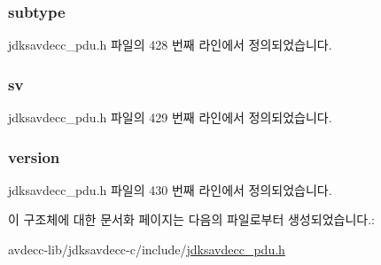 \subsubsection[{\texorpdfstring{subtype}{subtype}}]{ subtype}\hypertarget{structjdksavdecc__common__control__header_aed06f4a516930ca81d204d53c61a1ef3}{}\label{structjdksavdecc__common__control__header_aed06f4a516930ca81d204d53c61a1ef3}


jdksavdecc\+\_\+pdu.\+h 파일의 428 번째 라인에서 정의되었습니다.

\subsubsection[{\texorpdfstring{sv}{sv}}]{ sv}\hypertarget{structjdksavdecc__common__control__header_a9eeedef9f348218323834a3cf44d64c4}{}\label{structjdksavdecc__common__control__header_a9eeedef9f348218323834a3cf44d64c4}


jdksavdecc\+\_\+pdu.\+h 파일의 429 번째 라인에서 정의되었습니다.

\subsubsection[{\texorpdfstring{version}{version}}]{ version}\hypertarget{structjdksavdecc__common__control__header_acd99bb05ca015e7d74448acb1deba7ca}{}\label{structjdksavdecc__common__control__header_acd99bb05ca015e7d74448acb1deba7ca}


jdksavdecc\+\_\+pdu.\+h 파일의 430 번째 라인에서 정의되었습니다.



이 구조체에 대한 문서화 페이지는 다음의 파일로부터 생성되었습니다.\+:\begin{DoxyCompactItemize}
\item 
avdecc-\/lib/jdksavdecc-\/c/include/\hyperlink{jdksavdecc__pdu_8h}{jdksavdecc\+\_\+pdu.\+h}\end{DoxyCompactItemize}

